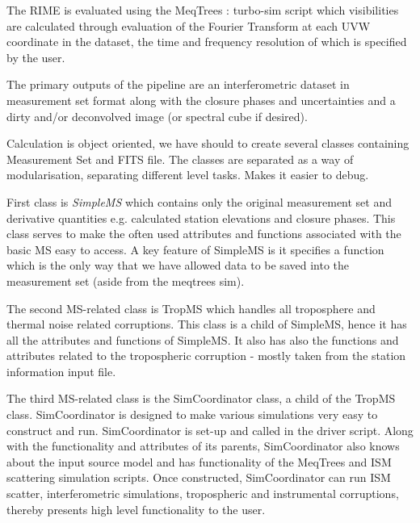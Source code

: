  
 The RIME is evaluated using the MeqTrees : turbo-sim script which visibilities are calculated through evaluation of the Fourier Transform at each UVW coordinate in the dataset, the time and frequency resolution of which is specified by the user.
 
 The primary outputs of the pipeline are an interferometric dataset in {\sc measurement set} format along with the closure phases and uncertainties and a dirty and/or deconvolved image (or spectral cube if desired). 







Calculation is object oriented, we have should to create several classes containing Measurement Set and FITS file. The classes are separated as a way of modularisation, separating different level tasks. Makes it easier to debug.

First class is \emph{SimpleMS} which contains only the original measurement set and derivative quantities e.g. calculated station elevations and closure phases. This class serves to make the often used attributes and functions associated with the basic MS easy to access. A key feature of SimpleMS is it specifies a function which is the only way that we have allowed data to be saved into the measurement set (aside from the meqtrees sim). 

The second MS-related class is TropMS which handles all troposphere and thermal noise related corruptions. This class is a child of SimpleMS, hence it has all the attributes and functions of SimpleMS. It also has also the functions and attributes related to the tropospheric corruption - mostly taken from the station information input file.

The third MS-related class is the SimCoordinator class, a child of the TropMS class. SimCoordinator is designed to make various simulations very easy to construct and run. SimCoordinator is set-up and called in the driver script. Along with the functionality and attributes of its parents, SimCoordinator also knows about the input source model and has functionality of the MeqTrees and ISM scattering simulation scripts. Once constructed, SimCoordinator can run ISM scatter, interferometric simulations, tropospheric and instrumental corruptions, thereby presents high level functionality to the user.





